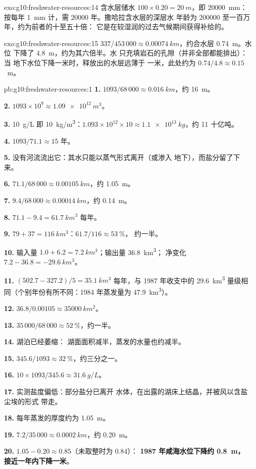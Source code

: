 \begin{solution}{exo:g10:freshwater-resources:14}
含水层储水 $100 \times 0.20 = \qty{20}{m}$，即
\qty{20000}{mm}：按每年 \qty{1}{mm} 计，需 \num{20000} 年。撒哈拉含水层的深层水
年龄为 \num{200000} 至一百万年，约为前者的十至五十倍：
它是在较湿润的过去气候期间获得补给的。
\end{solution}

\begin{solution}{exo:g10:freshwater-resources:15}
$337/453\,000 \approx \qty{0.00074}{km}$，约合水层 \qty{0.74}{m}。水位
下降了 \qty{4.8}{m}，约为其六倍半。水
只充填岩石的孔隙（并非全部都能排出）：当
地下水位下降一米时，释放出的水层远薄于
一米，此处约为 $0.74/4.8 \approx \num{0.15}$~m。
\end{solution}

\begin{solution}{pb:g10:freshwater-resources:1}
\textbf{1.} $1093/68\,000 \approx \qty{0.016}{km}$，约 \qty{16}{m}。

\textbf{2.} $1093 \times 10^9 \approx \qty{1.09e12}{m^3}$。

\textbf{3.} \qty{10}{g/L} 即 \qty{10}{kg/m^3}：$1.093 \times 10^{12} \times 10
\approx \qty{1.1e13}{kg}$，约 \num{11} 十亿吨。

\textbf{4.} $1093/71.1 \approx 15$ 年。

\textbf{5.} 没有河流流出它：其水只能以蒸气形式离开（或渗入
地下），而盐分留了下来。

\textbf{6.} $71.1/68\,000 \approx \qty{0.00105}{km}$，约 \qty{1.05}{m}。

\textbf{7.} $9.4/68\,000 \approx \qty{0.00014}{km}$，约 \qty{0.14}{m}。

\textbf{8.} $71.1 - 9.4 = \qty{61.7}{km^3}$ 每年。

\textbf{9.} $79 + 37 = \qty{116}{km^3}$：$61.7/116 \approx \qty{53}{\percent}$，
约一半。

\textbf{10.} 输入量 $1.0 + 6.2 = \qty{7.2}{km^3}$；输出量 \qty{36.8}{km^3}；
净变化 $7.2 - 36.8 = \qty{-29.6}{km^3}$。

\textbf{11.} $(502.7 - 327.2)/5 = \qty{35.1}{km^3}$ 每年，与
1987 年收支中的 \qty{29.6}{km^3} 量级相同（个别年份有所不同：1984 年蒸发量为
\qty{47.9}{km^3}）。

\textbf{12.} $36.8/0.00105 \approx \qty{35000}{km^2}$。

\textbf{13.} $35\,000/68\,000 \approx \qty{52}{\percent}$，约一半。

\textbf{14.} 湖泊已经萎缩：
湖面面积减半，蒸发的水量也约减半。

\textbf{15.} $345.6/1093 \approx \qty{32}{\percent}$，约三分之一。

\textbf{16.} $10 \times 1093/345.6 \approx \qty{31.6}{g/L}$。

\textbf{17.} 实测盐度偏低：部分盐分已离开
水体，在出露的湖床上结晶，并被风以含盐尘埃的形式
带走。

\textbf{18.} 每年蒸发的厚度约为 \qty{1.05}{m}。

\textbf{19.} $7.2/35\,000 \approx \qty{0.0002}{km}$，约 \qty{0.20}{m}。

\textbf{20.} $1.05 - 0.20 \approx 0.85$（未取整时为 \num{0.84}）：
\textbf{1987 年咸海水位下降约 \qty{0.8}{m}，
接近一年内下降一米}。
\end{solution}
